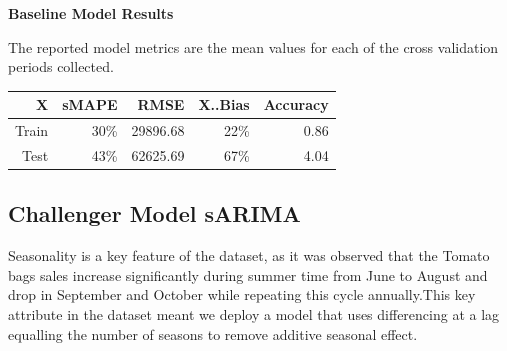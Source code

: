 \documentclass[12pt,oneside]{chicagocapstone}
\begin{document}
\textbf{Baseline Model Results}

The reported model metrics are the mean values for each of the cross
validation periods collected.
\begin{longtable}[]{@{}rrrrr@{}}
\toprule
X & sMAPE & RMSE & X..Bias & Accuracy\tabularnewline
\midrule
\endhead
Train & 30\% & 29896.68 & 22\% & 0.86\tabularnewline
Test & 43\% & 62625.69 & 67\% & 4.04\tabularnewline
\bottomrule
\end{longtable}
\subsection*{Challenger Model sARIMA}\label{findings-sARIMA}

Seasonality is a key feature of the dataset, as it was observed that the
Tomato bags sales increase significantly during summer time from June to
August and drop in September and October while repeating this cycle
annually.This key attribute in the dataset meant we deploy a model that
uses differencing at a lag equalling the number of seasons to remove
additive seasonal effect.
\end{document}
